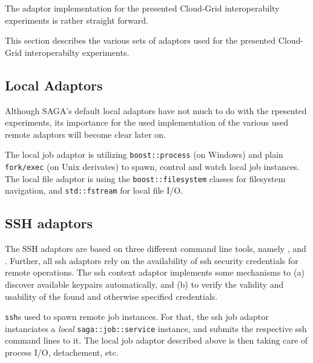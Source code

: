 
\newcommand{\T}[1]{\texttt{#1}}\xspace
\newcommand{\I}[1]{\textit{#1}}\xspace
\newcommand{\B}[1]{\textbf{#1}}\xspace

\newcommand{\ssh}[1]{\texttt{ssh}}\xspace
\newcommand{\scp}[1]{\texttt{scp}}\xspace
\newcommand{\sshfs}[1]{\texttt{sshfs}}\xspace


 The adaptor implementation for the presented Cloud-Grid
 interoperabilty experiments is rather straight forward. 
 
 This section describes the various sets of adaptors used for the
 presented Cloud-Grid interoperabilty experiments.  


 \subsection{Local Adaptors}

  Although SAGA's default local adaptors have not much to do with the
  rpesented experiments, its importance for the used implementation of
  the various used remote adaptors will become clear later on.

  The local job adaptor is utilizing \T{boost::process} (on Windows)
  and plain \T{fork/exec} (on Unix derivates) to spawn, control and
  watch local job instances.  The local file adaptor is using the
  \T{boost::filesystem} classes for filesystem navigation, and
  \T{std::fstream} for local file I/O. %


 \subsection{SSH adaptors}

  The SSH adaptors are based on three different command line tools,
  namely \Tssh, \Tscp and \Tsshfs.  Further, all ssh adaptors rely on
  the availability of ssh security credentials for remote operations.
  The ssh context adaptor implements some mechanisms to (a) discover
  available keypairs automatically, and (b) to verify the validity and
  usability of the found and otherwise specified credentials.
  
  \ssh is used to spawn remote job instances.  For that, the ssh job
  adaptor instanciates a \I{local} \T{saga::job::service} instance,
  and submits the respective ssh command lines to it.  The local job
  adaptor described above is then taking care of process I/O,
  detachement, etc.

